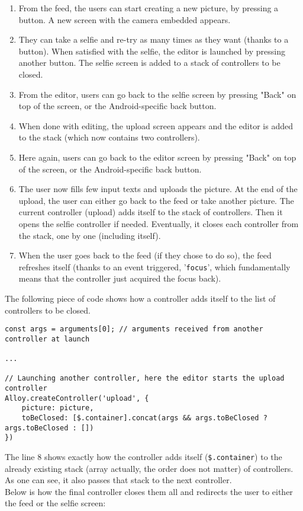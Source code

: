 \begin{enumerate}
  \item From the feed, the users can start creating a new picture, by pressing a button. A new screen with the camera embedded appears.
  \item They can take a selfie and re-try as many times as they want (thanks to a button). When satisfied with the selfie, the editor is launched by pressing another button. The selfie screen is added to a stack of controllers to be closed.
  \item From the editor, users can go back to the selfie screen by pressing "Back" on top of the screen, or the Android-specific back button.
  \item When done with editing, the upload screen appears and the editor is added to the stack (which now contains two controllers).
  \item Here again, users can go back to the editor screen by pressing "Back" on top of the screen, or the Android-specific back button.
  \item The user now fills few input texts and uploads the picture. At the end of the upload, the user can either go back to the feed or take another picture. The current controller (upload) adds itself to the stack of controllers. Then it opens the selfie controller if needed. Eventually, it closes each controller from the stack, one by one (including itself).
  \item When the user goes back to the feed (if they chose to do so), the feed refreshes itself (thanks to an event triggered, '\lstinline{focus}', which fundamentally means that the controller just acquired the focus back).
\end{enumerate}

The following piece of code shows how a controller adds itself to the list of controllers to be closed.

\lstset{
    numbers=left
}
\javascript
\begin{lstlisting}
const args = arguments[0]; // arguments received from another controller at launch

...

// Launching another controller, here the editor starts the upload controller
Alloy.createController('upload', {
    picture: picture,
    toBeClosed: [$.container].concat(args && args.toBeClosed ? args.toBeClosed : [])
})
\end{lstlisting}
\lstset{
    numbers=none
}

The line 8 shows exactly how the controller adds itself (\lstinline{$.container}) to the already existing stack (array actually, the order does not matter) of controllers. As one can see, it also passes that stack to the next controller.\\
Below is how the final controller closes them all and redirects the user to either the feed or the selfie screen:

